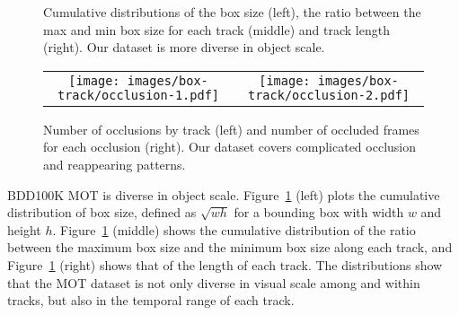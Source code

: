 \begin{figure}[tp]
    \centering
    \vspace{4mm}
    \setlength{\tabcolsep}{1pt}
    \caption{\small Cumulative distributions of the box size (left), the ratio between the max and min box size for each track (middle) and track length (right). Our dataset is more diverse in object scale.\vspace{-1mm}}
    \label{fig:mot-track}
\end{figure}

\begin{figure}[htp]
    \vspace{-2mm}

    \centering
    \setlength{\tabcolsep}{1pt}

    \begin{tabular}{cc}
        \texttt{[image: images/box-track/occlusion-1.pdf]} & \hspace{3mm}
        \texttt{[image: images/box-track/occlusion-2.pdf]} \\
    \end{tabular}
    \vspace{-2mm}
    \caption{\small Number of occlusions by track (left) and number of occluded frames for each occlusion (right).  Our dataset covers complicated occlusion and reappearing patterns. \vspace{-2mm}}
    \label{fig:mot-occlusion}
    
\end{figure}

BDD100K MOT is diverse in object scale. Figure~\ref{fig:mot-track} (left) plots the cumulative distribution of box size, defined as $\sqrt{wh}$ for a bounding box with width $w$ and height $h$. Figure~\ref{fig:mot-track} (middle) shows the cumulative distribution of the ratio between the maximum box size and the minimum box size along each track, and  Figure~\ref{fig:mot-track} (right) shows that of the length of each track. The distributions show that the MOT dataset is not only diverse in visual scale among and within tracks, but also in the temporal range of each track.

